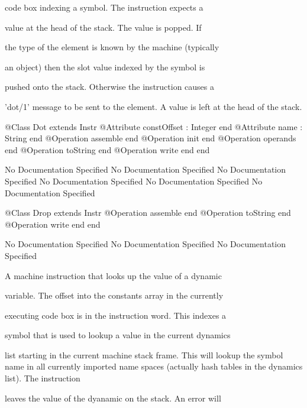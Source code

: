       code box indexing a symbol. The instruction expects a

      value at the head of the stack. The value is popped. If

      the type of the element is known by the machine (typically

      an object) then the slot value indexed by the symbol is

      pushed onto the stack. Otherwise the instruction causes a

      'dot/1' message to be sent to the element. A value is left 
      at the head of the stack.
\begin{Interface}
@Class Dot extends Instr
  @Attribute constOffset : Integer end
  @Attribute name : String end
  @Operation assemble end
  @Operation init end
  @Operation operands end
  @Operation toString end
  @Operation write end
end
\end{Interface}
No Documentation Specified
No Documentation Specified
No Documentation Specified
No Documentation Specified
No Documentation Specified
No Documentation Specified
\begin{Interface}
@Class Drop extends Instr
  @Operation assemble end
  @Operation toString end
  @Operation write end
end
\end{Interface}
No Documentation Specified
No Documentation Specified
No Documentation Specified

      A machine instruction that looks up the value of a dynamic

      variable. The offset into the constants array in the currently

      executing code box is in the instruction word. This indexes a

      symbol that is used to lookup a value in the current dynamics

      list starting in the current machine stack frame. This will 
      lookup the symbol name in all currently imported name spaces 
      (actually hash tables in the dynamics list). The instruction

      leaves the value of the dyanamic on the stack. An error will


